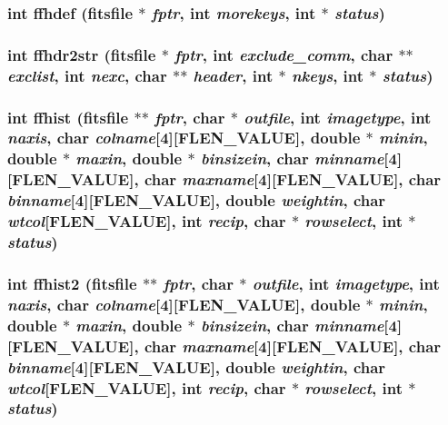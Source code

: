 \subsubsection{\setlength{\rightskip}{0pt plus 5cm}int ffhdef (\bf{fitsfile} $\ast$ {\em fptr}, int {\em morekeys}, int $\ast$ {\em status})}\label{fitsio_8h_628680d63bbae293fa53b48bdc0afbdd}


\subsubsection{\setlength{\rightskip}{0pt plus 5cm}int ffhdr2str (\bf{fitsfile} $\ast$ {\em fptr}, int {\em exclude\_\-comm}, char $\ast$$\ast$ {\em exclist}, int {\em nexc}, char $\ast$$\ast$ {\em header}, int $\ast$ {\em nkeys}, int $\ast$ {\em status})}\label{fitsio_8h_909b37f8894feb8f3e02d35dceee3f53}


\subsubsection{\setlength{\rightskip}{0pt plus 5cm}int ffhist (\bf{fitsfile} $\ast$$\ast$ {\em fptr}, char $\ast$ {\em outfile}, int {\em imagetype}, int {\em naxis}, char {\em colname}[4][FLEN\_\-VALUE], double $\ast$ {\em minin}, double $\ast$ {\em maxin}, double $\ast$ {\em binsizein}, char {\em minname}[4][FLEN\_\-VALUE], char {\em maxname}[4][FLEN\_\-VALUE], char {\em binname}[4][FLEN\_\-VALUE], double {\em weightin}, char {\em wtcol}[FLEN\_\-VALUE], int {\em recip}, char $\ast$ {\em rowselect}, int $\ast$ {\em status})}\label{fitsio_8h_abc1ac3fe3154b853aec9e8069a53104}


\subsubsection{\setlength{\rightskip}{0pt plus 5cm}int ffhist2 (\bf{fitsfile} $\ast$$\ast$ {\em fptr}, char $\ast$ {\em outfile}, int {\em imagetype}, int {\em naxis}, char {\em colname}[4][FLEN\_\-VALUE], double $\ast$ {\em minin}, double $\ast$ {\em maxin}, double $\ast$ {\em binsizein}, char {\em minname}[4][FLEN\_\-VALUE], char {\em maxname}[4][FLEN\_\-VALUE], char {\em binname}[4][FLEN\_\-VALUE], double {\em weightin}, char {\em wtcol}[FLEN\_\-VALUE], int {\em recip}, char $\ast$ {\em rowselect}, int $\ast$ {\em status})}\label{fitsio_8h_82fd106b8fa747b8b0895c6f1419c328}


